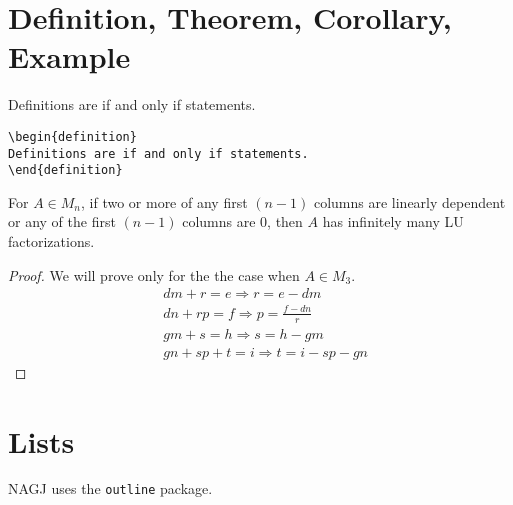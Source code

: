  
  
 
\section{Definition, Theorem, Corollary, Example}


\begin{definition}
Definitions are if and only if statements.  
\end{definition}

\begin{verbatim}
\begin{definition}
Definitions are if and only if statements.  
\end{definition}
\end{verbatim}

\begin{theorem}
{For $A \in M_n$, if two or more of any first $(n-1)$ columns are linearly dependent or any of the first $(n-1)$ columns are 0, then $A$ has infinitely many LU factorizations.}
\end{theorem}

\begin{proof} We will prove only for the the case when $A \in M_3$. \\
 \begin{align} 
&dm + r = e  \Rightarrow r = e-dm \label{eqn:1}\\
&dn + rp = f \Rightarrow p=\frac{f-dn}{r} \label{eqn:2}\\
&gm + s = h \Rightarrow s = h - gm \label{eqn:3}\\
&gn + sp + t = i \Rightarrow t  = i-sp-gn \label{eqn:4}
\end{align}
 
\end{proof}

 

 







 









 \section{Lists}
 NAGJ uses the \verb|outline| package.  
 
